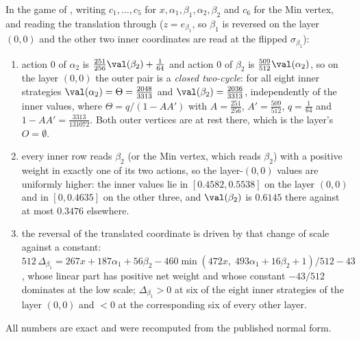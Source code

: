 \begin{proposition}\label{b3:l2-design}
In the game of , writing $c_1,\dots,c_5$ for
$x,\alpha_1,\beta_1,\alpha_2,\beta_2$ and $c_6$ for the Min vertex, and reading
the translation through  ($z=e_{\beta_1}$, so $\beta_1$ is
reversed on the layer $(0,0)$ and the other two inner coordinates are read at
the flipped $\sigma_{\beta_1}$):
\begin{enumerate}[label=(\roman*),leftmargin=2.2em]
\item action $0$ of $\alpha_2$ is $\tfrac{251}{256}\val(\beta_2)+\tfrac1{64}$
      and action $0$ of $\beta_2$ is $\tfrac{509}{512}\val(\alpha_2)$, so on the
      layer $(0,0)$ the outer pair is a \emph{closed two-cycle}: for all eight
      inner strategies $\val(\alpha_2)=\Theta=\tfrac{2048}{3313}$ and
      $\val(\beta_2)=\tfrac{2036}{3313}$, independently of the inner values,
      where $\Theta=q/(1-AA')$ with $A=\tfrac{251}{256}$,
      $A'=\tfrac{509}{512}$, $q=\tfrac1{64}$ and $1-AA'=\tfrac{3313}{131072}$.
      Both outer vertices are at rest there, which is the layer's
      $O=\emptyset$.
\item every inner row reads $\beta_2$ (or the Min vertex, which reads
      $\beta_2$) with a positive weight in exactly one of its two actions, so
      the layer-$(0,0)$ values are uniformly higher: the inner values lie in
      $[0.4582,0.5538]$ on the layer $(0,0)$ and in $[0,0.4635]$ on the other
      three, and $\val(\beta_2)$ is $0.6145$ there against at most $0.3476$
      elsewhere.
\item the reversal of the translated coordinate is driven by that change of
      scale against a constant: $512\,\Delta_{\beta_1}=267x+187\alpha_1
      +56\beta_2-460\min(472x,\;493\alpha_1+16\beta_2+1)/512-43$, whose linear
      part has positive net weight and whose constant $-43/512$ dominates at
      the low scale; $\Delta_{\beta_1}>0$ at six of the eight inner strategies
      of the layer $(0,0)$ and $<0$ at the corresponding six of every other
      layer.
\end{enumerate}
All numbers are exact and were recomputed from the published normal form.
\end{proposition}

